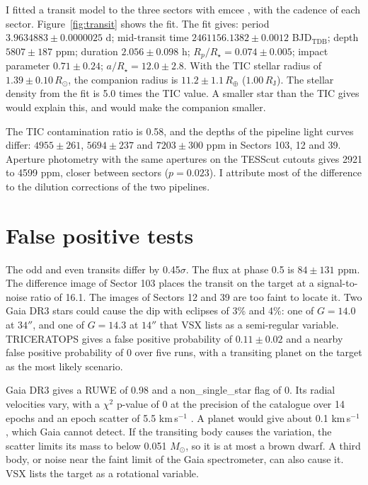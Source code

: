 \documentclass{aastex701}
\begin{document}
I fitted a transit model \citep{kreidberg2015} to the three sectors with emcee \citep{foremanmackey2013}, with the
cadence of each sector. Figure~\ref{fig:transit} shows the fit. The fit gives:
period $3.9634883 \pm 0.0000025$ d;
mid-transit time $2461156.1382 \pm 0.0012$ BJD$_\mathrm{TDB}$;
depth $5807 \pm 187$ ppm;
duration $2.056 \pm 0.098$ h;
$R_p/R_\star = 0.074 \pm 0.005$;
impact parameter $0.71 \pm 0.24$;
$a/R_\star = 12.0 \pm 2.8$.
With the TIC stellar radius of $1.39 \pm 0.10\,R_\odot$, the companion radius is $11.2 \pm 1.1\,R_\oplus$
($1.00\,R_\mathrm{J}$). The stellar density from the fit is 5.0 times the TIC value. A smaller star than the TIC
gives would explain this, and would make the companion smaller.

The TIC contamination ratio is 0.58, and the depths of the pipeline light curves differ: $4955 \pm 261$, $5694 \pm 237$
and $7203 \pm 300$ ppm in Sectors 103, 12 and 39. Aperture photometry with the same apertures on the TESScut cutouts
\citep{brasseur2019} gives 2921 to 4599 ppm, closer between sectors ($p = 0.023$). I attribute most of the
difference to the dilution corrections of the two pipelines.

\section{False positive tests}

The odd and even transits differ by 0.45$\sigma$. The flux at phase 0.5 is $84 \pm 131$ ppm. The difference image
\citep{bryson2013} of Sector 103 places the transit on the target at a signal-to-noise ratio of 16.1. The images of
Sectors 12 and 39 are too faint to locate it. Two Gaia DR3 stars could cause the dip with eclipses of 3\% and 4\%: one
of $G=14.0$ at $34''$, and one of $G=14.3$ at $14''$ that VSX \citep{watson2006} lists as a semi-regular variable.
TRICERATOPS \citep{giacalone2021} gives a false positive probability of $0.11 \pm 0.02$ and a nearby false positive
probability of 0 over five runs, with a transiting planet on the target as the most likely scenario.

Gaia DR3 \citep{gaia2023} gives a RUWE of 0.98 and a non\_single\_star flag of 0. Its radial velocities vary,
with a $\chi^2$ p-value of 0 at the precision of the catalogue over 14 epochs and an epoch scatter of 5.5 km\,s$^{-1}$ \citep{katz2023}. A planet would give
about 0.1 km\,s$^{-1}$, which Gaia cannot detect. If the transiting body causes the variation, the scatter limits its
mass to below 0.051 $M_\odot$, so it is at most a brown dwarf. A third body, or noise near the faint limit of the
Gaia spectrometer, can also cause it. VSX lists the target as a rotational variable.
\end{document}
